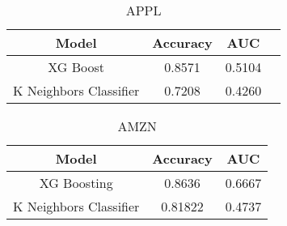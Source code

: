 \documentclass{article}
\title{}
\author{}
\date{}
\begin{document}
\maketitle

\begin{table}[h]
\centering
\begin{tabular}{cccc}
\hline
\textbf{Model} & \textbf{Accuracy} & \textbf{AUC}  \\ \hline
XG Boost &    0.8571 & 0.5104 \\
K Neighbors Classifier &    0.7208	 & 0.4260 \\\hline
\end{tabular}
\caption{APPL}
\end{table}

\begin{table}[h]
\centering
\begin{tabular}{ccc}
\hline
\textbf{Model} & \textbf{Accuracy} & \textbf{AUC} \\ \hline
XG Boosting & 0.8636 &0.6667 \\
K Neighbors Classifier & 0.81822 & 0.4737	 \\ \hline
\end{tabular}
\caption{AMZN}
\end{table}
\end{document}
